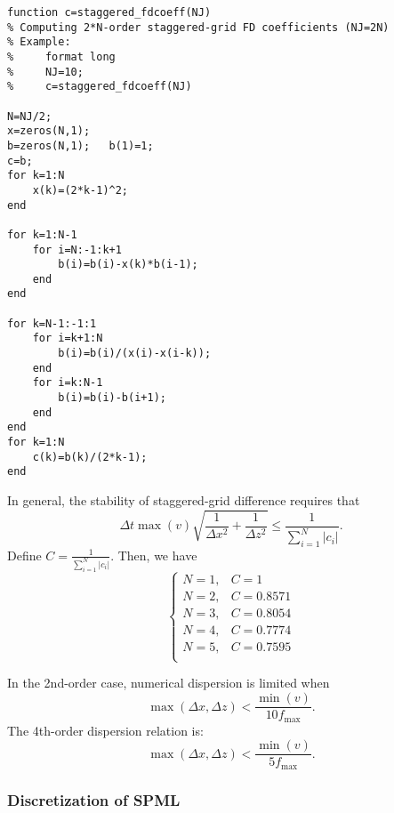 
\begin{lstlisting}
function c=staggered_fdcoeff(NJ)
% Computing 2*N-order staggered-grid FD coefficients (NJ=2N)
% Example:
%     format long
%     NJ=10;
%     c=staggered_fdcoeff(NJ)

N=NJ/2;
x=zeros(N,1);
b=zeros(N,1);   b(1)=1;
c=b;
for k=1:N
    x(k)=(2*k-1)^2;
end

for k=1:N-1
    for i=N:-1:k+1
        b(i)=b(i)-x(k)*b(i-1);
    end
end

for k=N-1:-1:1
    for i=k+1:N
        b(i)=b(i)/(x(i)-x(i-k));
    end
    for i=k:N-1
        b(i)=b(i)-b(i+1);
    end
end
for k=1:N
    c(k)=b(k)/(2*k-1);
end
\end{lstlisting}


In general, the stability of staggered-grid difference requires that
\begin{equation}
\Delta t\max(v)\sqrt{\frac{1}{\Delta x^2}+\frac{1}{\Delta z^2}}
\leq \frac{1}{\sum_{i=1}^N |c_i|}.
\end{equation}
Define $C=\frac{1}{\sum_{i=1}^N |c_i|}$. Then, we have
\begin{displaymath}
\begin{cases}
N=1, & C=1\\
N=2, & C=0.8571\\
N=3, & C=0.8054\\
N=4, & C=0.7774\\
N=5, & C=0.7595\\
\end{cases}
\end{displaymath}

In the 2nd-order case, numerical dispersion is limited when
\begin{equation}
\max(\Delta x, \Delta z)<\frac{\min (v)}{10f_{\max}}.
\end{equation}
The 4th-order dispersion relation is:
\begin{equation}
\max(\Delta x, \Delta z)<\frac{\min (v)}{5f_{\max}}.
\end{equation}



\subsubsection{Discretization of SPML}

